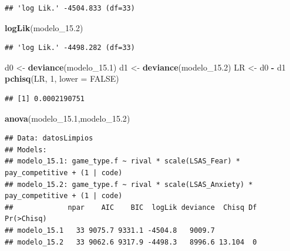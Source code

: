 \documentclass[
]{article}
\newenvironment{Shaded}{\begin{snugshade}}{\end{snugshade}}
\newcommand{\AttributeTok}[1]{\textcolor[rgb]{0.13,0.29,0.53}{#1}}
\newcommand{\ConstantTok}[1]{\textcolor[rgb]{0.56,0.35,0.01}{#1}}
\newcommand{\DecValTok}[1]{\textcolor[rgb]{0.00,0.00,0.81}{#1}}
\newcommand{\FloatTok}[1]{\textcolor[rgb]{0.00,0.00,0.81}{#1}}
\newcommand{\FunctionTok}[1]{\textcolor[rgb]{0.13,0.29,0.53}{\textbf{#1}}}
\newcommand{\NormalTok}[1]{#1}
\newcommand{\OtherTok}[1]{\textcolor[rgb]{0.56,0.35,0.01}{#1}}
\newcommand{\SpecialCharTok}[1]{\textcolor[rgb]{0.81,0.36,0.00}{\textbf{#1}}}
\begin{document}
\begin{verbatim}
## 'log Lik.' -4504.833 (df=33)
\end{verbatim}

\begin{Shaded}
\begin{Highlighting}[]
\FunctionTok{logLik}\NormalTok{(modelo\_15}\FloatTok{.2}\NormalTok{)}
\end{Highlighting}
\end{Shaded}

\begin{verbatim}
## 'log Lik.' -4498.282 (df=33)
\end{verbatim}

\begin{Shaded}
\begin{Highlighting}[]
\NormalTok{d0 }\OtherTok{\textless{}{-}} \FunctionTok{deviance}\NormalTok{(modelo\_15}\FloatTok{.1}\NormalTok{)}
\NormalTok{d1 }\OtherTok{\textless{}{-}} \FunctionTok{deviance}\NormalTok{(modelo\_15}\FloatTok{.2}\NormalTok{)}
\NormalTok{LR }\OtherTok{\textless{}{-}}\NormalTok{ d0 }\SpecialCharTok{{-}}\NormalTok{ d1}
\FunctionTok{pchisq}\NormalTok{(LR, }\DecValTok{1}\NormalTok{, }\AttributeTok{lower =} \ConstantTok{FALSE}\NormalTok{)}
\end{Highlighting}
\end{Shaded}

\begin{verbatim}
## [1] 0.0002190751
\end{verbatim}

\begin{Shaded}
\begin{Highlighting}[]
\FunctionTok{anova}\NormalTok{(modelo\_15}\FloatTok{.1}\NormalTok{,modelo\_15}\FloatTok{.2}\NormalTok{)}
\end{Highlighting}
\end{Shaded}

\begin{verbatim}
## Data: datosLimpios
## Models:
## modelo_15.1: game_type.f ~ rival * scale(LSAS_Fear) * pay_competitive + (1 | code)
## modelo_15.2: game_type.f ~ rival * scale(LSAS_Anxiety) * pay_competitive + (1 | code)
##             npar    AIC    BIC  logLik deviance  Chisq Df Pr(>Chisq)
## modelo_15.1   33 9075.7 9331.1 -4504.8   9009.7                     
## modelo_15.2   33 9062.6 9317.9 -4498.3   8996.6 13.104  0
\end{verbatim}
\end{document}
